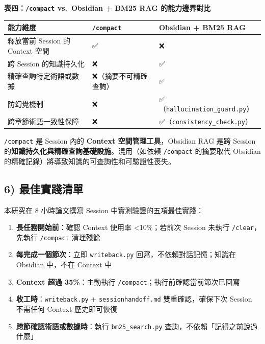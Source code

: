 \textbf{表四：\texttt{/compact} vs.~Obsidian + BM25 RAG 的能力邊界對比}

{\def\LTcaptype{none} %
\begin{longtable}[]{@{}lll@{}}
\toprule\noalign{}
能力維度 & \texttt{/compact} & Obsidian + BM25 RAG \\
\midrule\noalign{}
\endhead
\bottomrule\noalign{}
\endlastfoot
釋放當前 Session 的 Context 空間 & ✅ & ❌ \\
跨 Session 的知識持久化 & ❌ & ✅ \\
精確查詢特定術語或數據 & ❌（摘要不可精確查詢） & ✅ \\
防幻覺機制 & ❌ & ✅（\texttt{hallucination\_guard.py}） \\
跨章節術語一致性保障 & ❌ & ✅（\texttt{consistency\_check.py}） \\
\end{longtable}
}

\texttt{/compact} 是 Session 內的 \textbf{Context
空間管理工具}，Obsidian RAG 是跨 Session
的\textbf{知識持久化與精確查詢基礎設施}。混用（如依賴 \texttt{/compact}
的摘要取代 Obsidian 的精確記錄）將導致知識的可查詢性和可驗證性喪失。

\subsection{6) 最佳實踐清單}\label{ux6700ux4f73ux5be6ux8e10ux6e05ux55ae}

本研究在 8 小時論文撰寫 Session 中實測驗證的五項最佳實踐：

\begin{enumerate}
\def\labelenumi{\arabic{enumi}.}
\tightlist
\item
  \textbf{長任務開始前}：確認 Context 使用率 \textless10\%；若前次
  Session 未執行 \texttt{/clear}，先執行 \texttt{/compact} 清理殘餘
\item
  \textbf{每完成一個節次}：立即 \texttt{writeback.py}
  回寫，不依賴對話記憶；知識在 Obsidian 中，不在 Context 中
\item
  \textbf{Context 超過 35\%}：主動執行
  \texttt{/compact}；執行前確認當前節次已回寫
\item
  \textbf{收工時}：\texttt{writeback.py} + \texttt{sessionhandoff.md}
  雙重確認，確保下次 Session 不需任何 Context 歷史即可恢復
\item
  \textbf{跨節確認術語或數據時}：執行 \texttt{bm25\_search.py}
  查詢，不依賴「記得之前說過什麼」
\end{enumerate}

